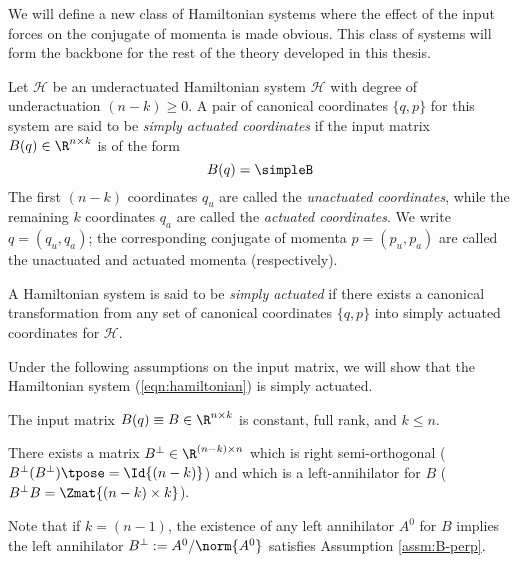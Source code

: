 We will define a new class of Hamiltonian systems where the effect of the input
forces on the conjugate of momenta is made obvious. This class of systems will
form the backbone for the rest of the theory developed in this thesis.

\begin{defn}
    Let \(\mathcal{H}\) be an underactuated Hamiltonian system 
    \(\mathcal{H}\) with degree of underactuation \((n-k)\geq 0\). 
    A pair of canonical coordinates \(\{q,p\}\) for this system
    are said to be \textit{simply actuated coordinates} if the
    input matrix \(B(q) \in \R^{n \times k}\) is of the form
    \[
        B(q) = \simpleB    
    \]
    The first \((n-k)\) coordinates \(q_u\) are called the \textit{unactuated
    coordinates}, while the remaining \(k\) coordinates \(q_a\) are called the
    \textit{actuated coordinates}. We write \(q = (q_u, q_a)\); the
    corresponding conjugate of momenta \(p = (p_u, p_a)\) are called the
    unactuated and actuated momenta (respectively).
\end{defn}
\begin{defn}
    A Hamiltonian system is said to be \textit{simply actuated} if there exists
    a canonical transformation from any set of canonical coordinates 
    \(\{q,p\}\) into simply actuated coordinates for \(\mathcal{H}\).
\end{defn}

Under the following assumptions on the input matrix, we will show that the
Hamiltonian system (\ref{eqn:hamiltonian}) is simply actuated.

\begin{assm}\label{assm:B-const}
    The input matrix \(B(q) \equiv B \in \R^{n\times k}\) is constant,
    full rank, and \(k \leq n\).
\end{assm}
\begin{assm}\label{assm:B-perp}
    There exists a matrix 
    \(B^\perp \in \R^{(n-k)\times n}\)
    which is right semi-orthogonal 
    (\(B^\perp(B^\perp)\tpose = \Id{(n-k)}\))
    and which is a left-annihilator for \(B\)
    (\(B^\perp B = \Zmat{(n-k) \times k}\)).
\end{assm}

Note that if \(k = (n-1)\), the existence of any left annihilator \(A^0\) for
\(B\) implies the left annihilator \(B^\perp := A^0/\norm{A^0}\) satisfies Assumption
\ref{assm:B-perp}.

